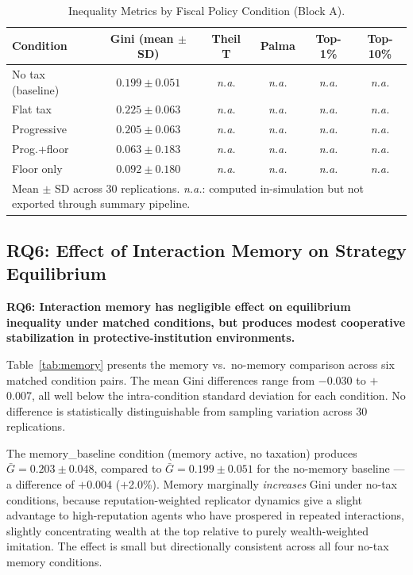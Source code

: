 \documentclass[12pt, letterpaper]{article}
\begin{document}
\begin{table}[h]
\centering
\caption{Inequality Metrics by Fiscal Policy Condition (Block A).}
\label{tab:inequality_suite}
\small
\begin{tabular}{lccccc}
\toprule
Condition & Gini (mean $\pm$ SD) & Theil T & Palma & Top-1\% & Top-10\% \\
\midrule
No tax (baseline) & $0.199 \pm 0.051$ & \textit{n.a.} & \textit{n.a.} & \textit{n.a.} & \textit{n.a.} \\
Flat tax          & $0.225 \pm 0.063$ & \textit{n.a.} & \textit{n.a.} & \textit{n.a.} & \textit{n.a.} \\
Progressive       & $0.205 \pm 0.063$ & \textit{n.a.} & \textit{n.a.} & \textit{n.a.} & \textit{n.a.} \\
Prog.+floor       & $0.063 \pm 0.183$ & \textit{n.a.} & \textit{n.a.} & \textit{n.a.} & \textit{n.a.} \\
Floor only        & $0.092 \pm 0.180$ & \textit{n.a.} & \textit{n.a.} & \textit{n.a.} & \textit{n.a.} \\
\bottomrule
\multicolumn{6}{l}{\small Mean $\pm$ SD across 30 replications. \textit{n.a.}: computed in-simulation but not exported through summary pipeline.}
\end{tabular}
\end{table}

\subsection{RQ6: Effect of Interaction Memory on Strategy Equilibrium}

\textbf{RQ6: Interaction memory has negligible effect on equilibrium
inequality under matched conditions, but produces modest cooperative
stabilization in protective-institution environments.}

Table~\ref{tab:memory} presents the memory vs.\ no-memory comparison
across six matched condition pairs. The mean Gini differences range
from $-$0.030 to $+$0.007, all well below the intra-condition standard
deviation for each condition. No difference is statistically
distinguishable from sampling variation across 30 replications.

The memory\_baseline condition (memory active, no taxation) produces
$\bar{G} = 0.203 \pm 0.048$, compared to $\bar{G} = 0.199 \pm 0.051$
for the no-memory baseline --- a difference of $+$0.004 ($+$2.0\%).
Memory marginally \emph{increases} Gini under no-tax conditions, because
reputation-weighted replicator dynamics give a slight advantage to
high-reputation agents who have prospered in repeated interactions,
slightly concentrating wealth at the top relative to purely
wealth-weighted imitation. The effect is small but directionally
consistent across all four no-tax memory conditions.
\end{document}

